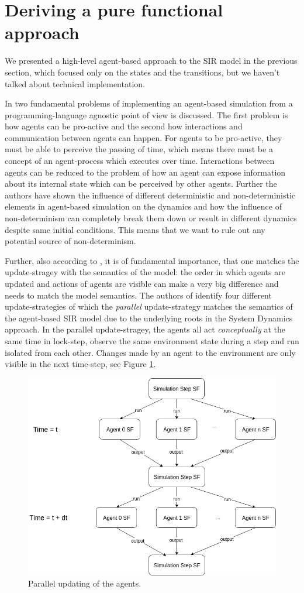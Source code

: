 \section{Deriving a pure functional approach}
\label{sec:functional_approach}

We presented a high-level agent-based approach to the SIR model in the previous section, which focused only on the states and the transitions, but we haven't talked about technical implementation. 

In \cite{thaler_art_2017} two fundamental problems of implementing an agent-based simulation from a programming-language agnostic point of view is discussed. The first problem is how agents can be pro-active and the second how interactions and communication between agents can happen. For agents to be pro-active, they must be able to perceive the passing of time, which means there must be a concept of an agent-process which executes over time. Interactions between agents can be reduced to the problem of how an agent can expose information about its internal state which can be perceived by other agents. Further the authors have shown the influence of different deterministic and non-deterministic elements in agent-based simulation on the dynamics and how the influence of non-determinism can completely break them down or result in different dynamics despite same initial conditions. This means that we want to rule out any potential source of non-determinism.

Further, also according to \cite{thaler_art_2017}, it is of fundamental importance, that one matches the update-stragey with the semantics of the model: the order in which agents are updated and actions of agents are visible can make a very big difference and needs to match the model semantics. The authors of \cite{thaler_art_2017} identify four different update-strategies of which the \textit{parallel} update-strategy matches the semantics of the agent-based SIR model due to the underlying roots in the System Dynamics approach. In the parallel update-stragey, the agents all act \textit{conceptually} at the same time in lock-step, observe the same environment state during a step and run isolated from each other. Changes made by an agent to the environment are only visible in the next time-step, see Figure \ref{fig:parallel_strategy}.

\begin{figure}
	\centering
	\includegraphics[width=.4\textwidth, angle=0]{./fig/diagrams/parallel_strategy.png}
	\caption{Parallel updating of the agents.}
	\label{fig:parallel_strategy}
\end{figure}

